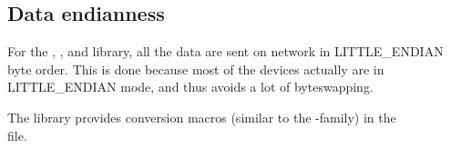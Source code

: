 \subsection*{Data endianness}

For the , ,  and  library, all the data are sent on network in LITTLE\_ENDIAN byte order. This is done because most of the devices actually are in LITTLE\_ENDIAN mode, and thus avoids a lot of byteswapping.

The  library provides conversion macros (similar to the -family) in the\\
 file.

